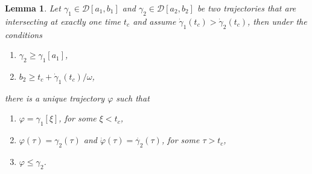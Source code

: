 \documentclass[a4paper]{article}
\theoremstyle{definition}
\theoremstyle{plain}
\newtheorem{lemma}{Lemma\hspace{0.25em}\ignorespaces}
\begin{document}
%


\begin{lemma}\label{lemma:curvejoining}
  Let $\gamma_{1} \in \mathcal{D}[a_{1}, b_{1}]$ and
  $\gamma_{2} \in \mathcal{D}[a_{2}, b_{2}]$ be two trajectories that are intersecting
  at exactly one time $t_{c}$ and assume
  $\dot{\gamma}_{1}(t_{c}) > \dot{\gamma}_{2}(t_{c})$,
  then under the conditions
  \begin{enumerate}[leftmargin=5em]
    \item[\normalfont(C1)\quad] $\gamma_{2} \geq \gamma_{1}[a_{1}]$,
    \item[\normalfont(C2)\quad] $b_{2} \geq t_{c} + \dot{\gamma}_{1}(t_{c}) / \omega$,
  \end{enumerate}
  there is a unique trajectory $\varphi$ such that
  \begin{enumerate}[label=(\roman*)\quad,leftmargin=5em]
    \item $\varphi = \gamma_{1}[\xi]$, for some $\xi < t_{c}$,
    \item $\varphi(\tau) = \gamma_{2}(\tau)$ and
          $\dot{\varphi}(\tau) = \dot{\gamma_{2}}(\tau)$, for some $\tau > t_{c}$,
    \item $\varphi \leq \gamma_{2}$.
  \end{enumerate}
\end{lemma}
\end{document}
